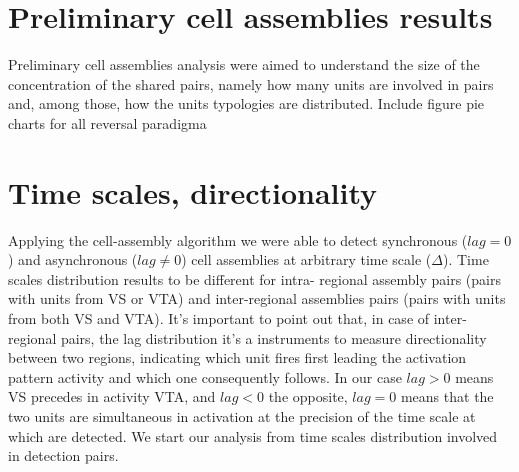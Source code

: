 \section{Preliminary cell assemblies results}
Preliminary cell assemblies analysis were aimed to understand the size of the concentration of the shared pairs, namely how many units are involved in pairs and, among those, how the units typologies are distributed.
{\color{red} Include figure pie charts for all reversal paradigma}
\section{Time scales, directionality}
Applying the cell-assembly algorithm we were able to detect synchronous ($lag=0$) and asynchronous ($lag\neq 0$) cell assemblies at arbitrary time scale ($\Delta$). Time scales distribution results to be different for intra- regional assembly pairs (pairs with units from VS or VTA) and inter-regional assemblies pairs (pairs with units from both VS and VTA). It's important to point out that, in case of inter-regional pairs, the lag distribution it's a instruments to measure directionality between two regions, indicating which unit fires first leading the activation pattern activity and which one consequently follows. In our case $lag >0$ means VS precedes in activity VTA, and $lag <0$ the opposite, $lag=0$ means that the two units are  simultaneous in activation at the precision of the time scale at which are detected.
We start our analysis from time scales distribution involved in detection pairs.
